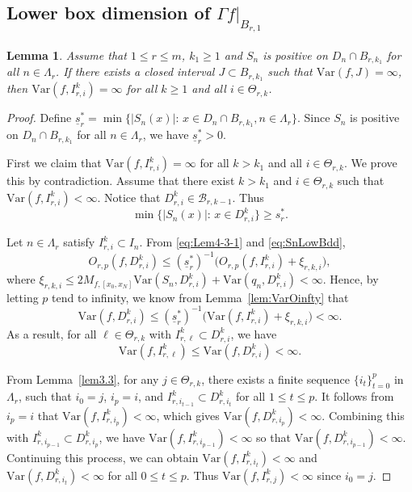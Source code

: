 \documentclass[11pt]{amsart}
\newtheorem{lem}[thm]{Lemma}
\theoremstyle{definition}
\theoremstyle{remark}
\numberwithin{equation}{section}
\newcommand{\lows}{{\underline{s}}}
\newcommand{\Var}{\mathrm{Var}}
\begin{document}
\subsection{Lower box dimension of $\Gamma f|_{B_{r,1}}$ }

\begin{lem}\label{lem:var-infty}
	Assume that $1 \leq r \leq m$, $k_1\geq 1$ and $S_n$ is positive on $D_n \cap B_{r,k_1}$ for all $n\in \Lambda_r$. 
	 If there exists a closed interval $J \subset B_{r,k_1}$ such that $\Var(f,J)=\infty$,
	then $\Var(f,I_{r,i}^k)=\infty$ for all $k\geq 1$ and all $i \in \Theta_{r,k}$.
\end{lem}

\begin{proof}
	Define $\lows^*_{r}=\min\{ |S_n(x)|:\, x\in D_n\cap B_{r,k_1}, n \in \Lambda_r \}$.
	Since $S_n$ is positive on $D_n \cap B_{r,k_1}$ for all $n\in \Lambda_r$, we have $\lows^*_{r}>0$.
	
	First we claim that $\Var(f,I_{r,i}^k)=\infty$ for all $k> k_1$ and all $i \in \Theta_{r,k}$.
	We prove this by contradiction. Assume that there exist $k> k_1$ and $i\in \Theta_{r,k}$ such that $\Var(f,I_{r,i}^k)<\infty$. Notice that $D_{r,i}^k\in \mathcal{B}_{r,k-1}$. Thus 
	\begin{equation}\label{eq:SnLowBdd}
	    \min\{|S_n(x)|:\, x\in D_{r,i}^k\}\geq s_r^*.
	\end{equation}
	
	Let $n\in \Lambda_r$ satisfy $I_{r,i}^k \subset I_n$. From \eqref{eq:Lem4-3-1} and \eqref{eq:SnLowBdd}, 
	\[
	O_{r,p}(f,D_{r,i}^k) \leq (\lows_{r}^{*})^{-1} \big( O_{r,p}(f, I_{r,i}^k) +\xi_{r,k,i} \big) ,
	\]
	where $\xi_{r,k,i}\leq 2M_{f,[x_0,x_N]} \Var (S_n,D_{r,i}^k ) +\Var(q_n,D_{r,i}^k)<\infty$. Hence, by letting $p$ tend to infinity, we know from 
	Lemma~\ref{lem:VarOinfty} that 
	\[ 
	\Var(f,D_{r,i}^k) \leq  (\lows_{r}^{*})^{-1} \big( \Var(f, I_{r,i}^k) +\xi_{r,k,i}\big)<\infty.
	\]
	As a result, for all $ \ell \in \Theta_{r,k} $ with $I_{r,\ell}^k \subset D_{r,i}^k$, we have
	$$ \Var(f,I_{r,\ell}^k) \leq \Var(f,D_{r,i}^k) <\infty.$$
	
	From Lemma~\ref{lem3.3}, for any $ j \in \Theta_{r,k} $, there exists a finite sequence $\{i_t\}_{t=0}^p$ in $\Lambda_r$, such that $i_0=j$, $i_p=i$, and
    $I_{r,i_{t-1}}^k \subset D_{r,i_{t}}^k$ for all $1\leq t \leq p$.
    It follows from $i_p=i$ that $\Var(f,I_{r,i_p}^k)<\infty$, which gives $\Var(f,D_{r,i_p}^k)<\infty$. Combining this with $I_{r,i_{p-1}}^k \subset D_{r,i_{p}}^k$, we have $\Var(f,I_{r,i_{p-1}}^k)<\infty$ so that $\Var(f,D_{r,i_{p-1}}^k)<\infty$. Continuing this process, we can obtain $\Var(f,I_{r,i_{t}}^k)<\infty$ and $\Var(f,D_{r,i_{t}}^k)<\infty$ for all $0\leq t\leq p$. Thus $\Var(f,I_{r,j}^k)<\infty$ since $i_0=j$.
    

\end{proof}
\end{document}
